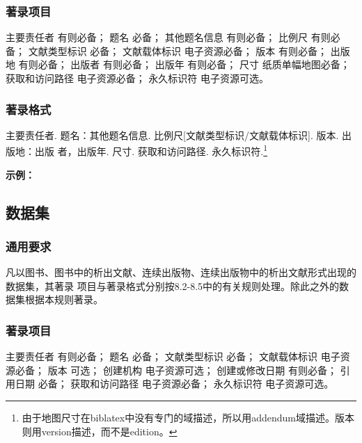 \documentclass{article}
\begin{document}
\subsubsection{著录项目}

主要责任者 有则必备；
题名 必备；
其他题名信息 有则必备；
比例尺 有则必备；
文献类型标识 必备；
文献载体标识 电子资源必备；
版本 有则必备；
出版地 有则必备；
出版者 有则必备；
出版年 有则必备；
尺寸 纸质单幅地图必备；
获取和访问路径 电子资源必备；
永久标识符 电子资源可选。

\subsubsection{著录格式}

主要责任者. 题名：其他题名信息. 比例尺[文献类型标识/文献载体标识]. 版本. 出版地：出版
者，出版年. 尺寸. 获取和访问路径. 永久标识符.\footnote{由于地图尺寸在biblatex中没有专门的域描述，所以用addendum域描述。版本则用version描述，而不是edition。}



\begin{refsection}
\nocite{胡健民2021--,刘祥沈2016地图,中工武大2019地图,吴自银2019地图,国家测绘2016地图,
訾冬梅2006地图,谭其骧1982地图,童世亨1926地图,CRIBB2015map}


\textbf{示例：}

{\printbibliography[heading=none,env=indentegenv]}

\end{refsection}


\subsection{数据集}

\subsubsection{通用要求}

凡以图书、图书中的析出文献、连续出版物、连续出版物中的析出文献形式出现的数据集，其著录
项目与著录格式分别按8.2-8.5中的有关规则处理。除此之外的数据集根据本规则著录。

\subsubsection{著录项目}

主要责任者 有则必备；
题名 必备；
文献类型标识 必备；
文献载体标识 电子资源必备；
版本 可选；
创建机构 电子资源可选；
创建或修改日期 有则必备；
引用日期 必备；
获取和访问路径 电子资源必备；
永久标识符 电子资源可选。
\end{document}
